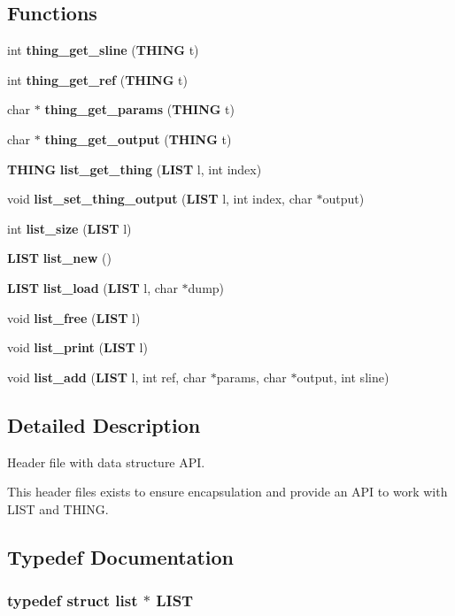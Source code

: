 \subsection*{Functions}
\begin{DoxyCompactItemize}
\item 
int {\bf thing\+\_\+get\+\_\+sline} ({\bf T\+H\+I\+NG} t)
\item 
int {\bf thing\+\_\+get\+\_\+ref} ({\bf T\+H\+I\+NG} t)
\item 
char $\ast$ {\bf thing\+\_\+get\+\_\+params} ({\bf T\+H\+I\+NG} t)
\item 
char $\ast$ {\bf thing\+\_\+get\+\_\+output} ({\bf T\+H\+I\+NG} t)
\item 
{\bf T\+H\+I\+NG} {\bf list\+\_\+get\+\_\+thing} ({\bf L\+I\+ST} l, int index)
\item 
void {\bf list\+\_\+set\+\_\+thing\+\_\+output} ({\bf L\+I\+ST} l, int index, char $\ast$output)
\item 
int {\bf list\+\_\+size} ({\bf L\+I\+ST} l)
\item 
{\bf L\+I\+ST} {\bf list\+\_\+new} ()
\item 
{\bf L\+I\+ST} {\bf list\+\_\+load} ({\bf L\+I\+ST} l, char $\ast$dump)
\item 
void {\bf list\+\_\+free} ({\bf L\+I\+ST} l)
\item 
void {\bf list\+\_\+print} ({\bf L\+I\+ST} l)
\item 
void {\bf list\+\_\+add} ({\bf L\+I\+ST} l, int ref, char $\ast$params, char $\ast$output, int sline)
\end{DoxyCompactItemize}


\subsection{Detailed Description}
Header file with data structure A\+PI. 

This header files exists to ensure encapsulation and provide an A\+PI to work with L\+I\+ST and T\+H\+I\+NG. 

\subsection{Typedef Documentation}
\subsubsection[{L\+I\+ST}]{\setlength{\rightskip}{0pt plus 5cm}typedef struct {\bf list} $\ast$ {\bf L\+I\+ST}}\label{data_structs_8h_a02dfe73aee9a117ed44a7abc305f1066}


